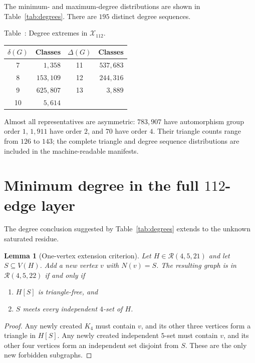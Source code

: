 \documentclass[10pt]{article}
\newtheorem{lemma}[theorem]{Lemma}
\theoremstyle{definition}
\theoremstyle{remark}
\newcommand{\Rcal}{\mathcal{R}}
\newcommand{\Xcal}{\mathcal{X}}
\begin{document}
The minimum- and maximum-degree distributions are shown in
Table~\ref{tab:degrees}.  There are $195$ distinct degree sequences.

\begin{center}
Table~\thetable: Degree extremes in $\Xcal_{112}$.\label{tab:degrees}\par\smallskip
\begin{tabular}{cr|cr}
\toprule
$\delta(G)$ & Classes & $\Delta(G)$ & Classes \\
\midrule
7  & $1{,}358$   & 11 & $537{,}683$ \\
8  & $153{,}109$ & 12 & $244{,}316$ \\
9  & $625{,}807$ & 13 & $3{,}889$ \\
10 & $5{,}614$   &    &             \\
\bottomrule
\end{tabular}
\end{center}

Almost all representatives are asymmetric: $783{,}907$ have automorphism
group order $1$, $1{,}911$ have order $2$, and $70$ have order $4$.  Their
triangle counts range from $126$ to $143$; the complete triangle and degree
sequence distributions are included in the machine-readable manifests.

\section{Minimum degree in the full $112$-edge layer}

The degree conclusion suggested by Table~\ref{tab:degrees} extends to the
unknown saturated residue.

\begin{lemma}[One-vertex extension criterion]\label{lem:extension}
Let $H\in\Rcal(4,5,21)$ and let $S\subseteq V(H)$.  Add a new vertex $v$
with $N(v)=S$.  The resulting graph is in $\Rcal(4,5,22)$ if and only if
\begin{enumerate}[label=(\roman*),itemsep=1pt]
  \item $H[S]$ is triangle-free, and
  \item $S$ meets every independent $4$-set of $H$.
\end{enumerate}
\end{lemma}

\begin{proof}
Any newly created $K_4$ must contain $v$, and its other three vertices form
a triangle in $H[S]$.  Any newly created independent $5$-set must contain
$v$, and its other four vertices form an independent set disjoint from $S$.
These are the only new forbidden subgraphs.
\end{proof}
\end{document}
